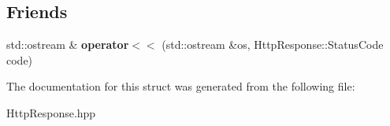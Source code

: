\subsection*{Friends}
\begin{DoxyCompactItemize}
\item 
\mbox{\label{structZiApi_1_1HttpResponse_a5fbba1f273ec865183cb4aa60661fdc7}} 
std\+::ostream \& {\bfseries operator$<$$<$} (std\+::ostream \&os, Http\+Response\+::\+Status\+Code code)
\end{DoxyCompactItemize}


The documentation for this struct was generated from the following file\+:\begin{DoxyCompactItemize}
\item 
Http\+Response.\+hpp\end{DoxyCompactItemize}
